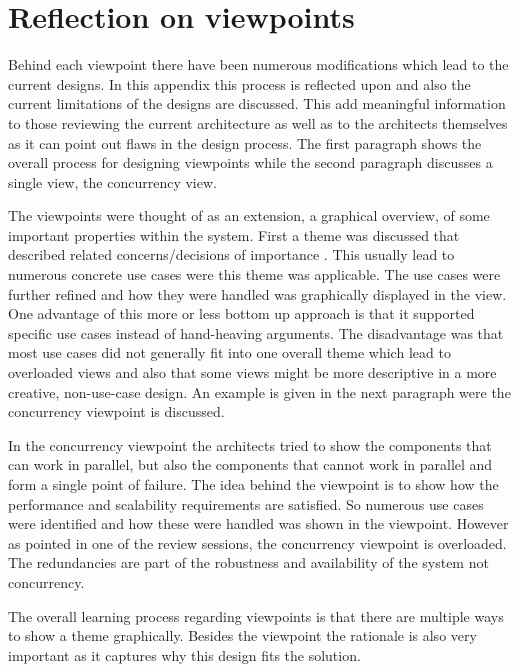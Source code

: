 \section{Reflection on viewpoints}

Behind each viewpoint there have been numerous modifications which lead to the current designs. In this appendix this process is reflected upon and also the current limitations of the designs are discussed.  This add meaningful information to those reviewing the current architecture as well as to the architects themselves as it can point out flaws in the design process. The first paragraph shows the overall process for designing viewpoints while the second paragraph discusses a single view, the concurrency view. \newline

The viewpoints were thought of as an extension, a graphical overview, of some important properties within the system. First a theme was discussed that described related concerns/decisions of importance . This usually lead to numerous concrete use cases were this theme was applicable. The use cases were further refined and how they were handled was graphically displayed in the view. One advantage of this more or less bottom up approach is that it supported specific use cases instead of hand-heaving arguments. The disadvantage was that most use cases did not generally fit into one overall theme which lead to overloaded views and also that some views might be more descriptive in a more creative, non-use-case design. An example is given in the next paragraph were the concurrency viewpoint is discussed.\newline

In the concurrency viewpoint the architects tried to show the components that can work in parallel, but also the components that cannot work in parallel and form a single point of failure. The idea behind the viewpoint is to show how the performance and scalability requirements are satisfied. So numerous use cases were identified and how these were handled was shown in the viewpoint. However as pointed in one of the review sessions, the concurrency viewpoint is overloaded. The redundancies are part of the robustness and availability of the system not concurrency. \newline 

The overall learning process regarding viewpoints is that there are multiple ways to show a theme graphically. Besides the viewpoint the rationale is also very important as it captures why this design fits the solution.